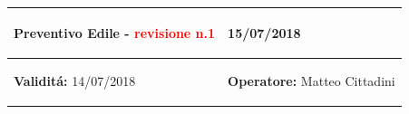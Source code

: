 \documentclass[a4paper]{article}
\begin{document}
  \begin{center}
  \begin{tabular}{|L{89mm} R{60mm}| }
  \hline
  \vspace{2.5mm}
  \begin{spacing}{0}
    \textbf{Preventivo Edile - }  \textcolor{red}{revisione n.1}
  \end{spacing}&
  \vspace{2.5mm}
  \begin{spacing}{0}
    15/07/2018
  \end{spacing}\\
  \hline
  \vspace{2.5mm}
  \begin{spacing}{0}
    \textbf{Validit\'a:} 14/07/2018
  \end{spacing} &
  \vspace{2.5mm}
  \begin{spacing}{0}
    \textbf{Operatore:} Matteo Cittadini
  \end{spacing} \\
  \hline
  \end{tabular}
  \end{center}
\end{document}
